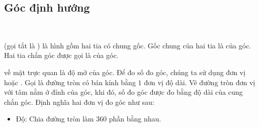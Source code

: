 \subsection{Góc định hướng}

\ %

 (gọi tắt là ) là hình gồm hai tia có chung gốc. Gốc chung của hai tia là  của góc. Hai tia chắn góc được gọi là  của góc.

 về mặt trực quan là độ mở của góc. Để đo số đo góc, chúng ta sử dụng đơn vị  hoặc . Gọi  là đường tròn có bán kính bằng $1$ đơn vị độ dài. Vẽ đường tròn đơn vị với tâm nằm ở đỉnh của góc, khi đó, số đo góc được đo bằng độ dài của cung chắn góc. Định nghĩa hai đơn vị đo góc như sau:
\begin{itemize}
   \item Độ: Chia đường tròn làm $360$ phần bằng nhau. 
\end{itemize}
